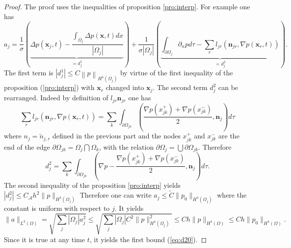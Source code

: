 \documentclass[a4paper,french,english,10pt]{article}
\newcommand\njr{\mathbf{n}_{jr}}
\newcommand\xj{\mathbf{x}_j}
\newcommand\xr{\mathbf{x}_r}
\begin{document}
\begin{proof} 
The proof  uses  the inequalities of proposition \ref{pro:interp}.  
For example one has 
$$
a_j=\frac1\sigma  \left(\underbrace{
 \Delta p(\mathbf x_j, t)- \frac{\int_{\Omega_j} \Delta  p (\mathbf x, t) dx}{|\Omega_j |}}_{=d_j^1}
 \right)
 +\frac1{\sigma | \Omega_j |} \left(\underbrace{ \int_{\partial \Omega_j }   \partial_n p d\tau 
 -
  \sum_r l_{jr}\left(\njr, \nabla p (\xr,t) \right) }_{=d^2_j}\right).
$$
The first term  is $| d^1_j |\leq C \left\|  p \right\|_{H^4(\Omega_j)}$
by virtue of the first inequality of the proposition (\ref{pro:interp}) with $\mathbf x_r$ changed
into $\mathbf x_j$.
The second term $d_j^2$ can be rearranged. Indeed 
by definition of $l_{jr} \njr$ one has
$$
 \sum_r l_{jr}\left(\njr, \nabla p (\xr,t) \right)=
\sum_k \int_{\partial\Omega_{jk}} \left(
\frac{  \nabla p\left(x_{jk}^+ \right)+ \nabla p\left(x_{jk}^- \right)   }2,
\mathbf{n}_j \right) d\tau
$$
where $n_j=\tilde{n}_{j,r}$ defined in the previous part and the nodes $x_{jk}^+$ and $x_{jk}^-$ are the end of the edge
$\partial\Omega_{jk}=\Omega_j\bigcap\Omega_k$, with the relation $\partial \Omega_j =
\bigcup\partial\Omega_{jk} $.
Therefore
$$
d_j^2=
\sum_k \int_{\partial\Omega_{jk}} \left(
\nabla p- \frac{  \nabla p\left(x_{jk}^+ \right)+ \nabla p\left(x_{jk}^- \right)
  }2, \mathbf{n}_j \right) d\tau .
$$
The second inequality of the proposition \ref{pro:interp} yields
$|d_j^2| \leq C_\mathcal A h^2 \|   p \|_{H^4(\Omega_j)}$
Therefore one can write  $a_j\leq \widetilde C \| p_0 \|_{H^4(\Omega_j)}$ where the constant is uniform
with respect to $j$. It yields
\begin{equation} \label{eq:bac1}
\| a\|_{L^2(\Omega)} = \sqrt{ \sum_j  |\Omega_j | a_j^2  }\leq \sqrt{ \sum_j  |\Omega_j| C^2 \| p \|_{H^4(\Omega_j)  }^2 } \leq C h \| p \|_{H^4(\Omega)  }\leq C h \| p_0 \|_{H^4(\Omega)  }.
\end{equation}
Since it is true at any time $t$, it yields the first bound (\ref{eq:d20}).


\end{proof}
\end{document}

